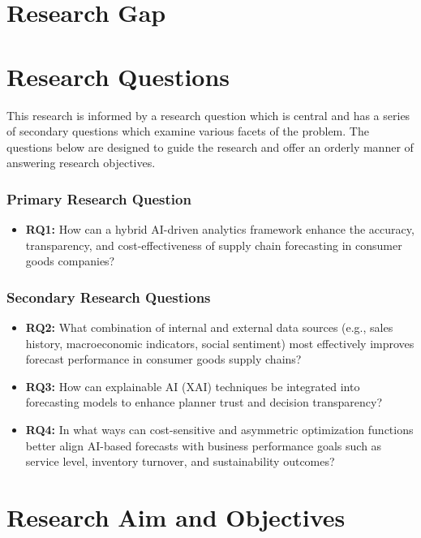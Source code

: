 \section{Research Gap}


\section{Research Questions}

This research is informed by a research question which is central and has a series of secondary questions which examine various facets of the problem. The questions below are designed to guide the research and offer an orderly manner of answering research objectives.

\subsubsection{Primary Research Question}

\begin{itemize}
    \item \textbf{RQ1:} How can a hybrid AI-driven analytics framework enhance the accuracy, transparency, and cost-effectiveness of supply chain forecasting in consumer goods companies? 
\end{itemize}

\subsubsection{Secondary Research Questions}

\begin{itemize}
    \item \textbf{RQ2:} What combination of internal and external data sources (e.g., sales history, macroeconomic indicators, social sentiment) most effectively improves forecast performance in consumer goods supply chains? 
    \item \textbf{RQ3:} How can explainable AI (XAI) techniques be integrated into forecasting models to enhance planner trust and decision transparency?
    \item \textbf{RQ4:} In what ways can cost-sensitive and asymmetric optimization functions better align AI-based forecasts with business performance goals such as service level, inventory turnover, and sustainability outcomes?
\end{itemize}

\section{Research Aim and Objectives}

